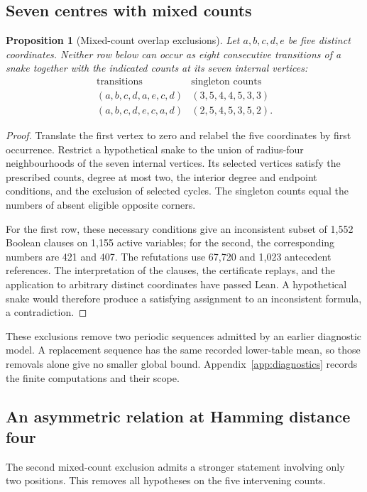 \documentclass[11pt,a4paper]{article}
\newtheorem{proposition}[theorem]{Proposition}
\theoremstyle{definition}
\theoremstyle{remark}
\begin{document}
\subsection{Seven centres with mixed counts}\label{sec:critical-overlap}
\begin{proposition}[Mixed-count overlap exclusions]\label{prop:mixed-overlap}
Let $a,b,c,d,e$ be five distinct coordinates. Neither row below can occur as eight consecutive transitions of a snake together with the indicated counts at its seven internal vertices:
\[
\begin{array}{c|c}
\text{transitions}&\text{singleton counts}\\\hline
(a,b,c,d,a,e,c,d)&(3,5,4,4,5,3,3)\\
(a,b,c,d,e,c,a,d)&(2,5,4,5,3,5,2).
\end{array}
\]
\end{proposition}
\begin{proof}
Translate the first vertex to zero and relabel the five coordinates by first occurrence. Restrict a hypothetical snake to the union of radius-four neighbourhoods of the seven internal vertices. Its selected vertices satisfy the prescribed counts, degree at most two, the interior degree and endpoint conditions, and the exclusion of selected cycles. The singleton counts equal the numbers of absent eligible opposite corners.

For the first row, these necessary conditions give an inconsistent subset of 1,552 Boolean clauses on 1,155 active variables; for the second, the corresponding numbers are 421 and 407. The refutations use 67,720 and 1,023 antecedent references. The interpretation of the clauses, the certificate replays, and the application to arbitrary distinct coordinates have passed Lean. A hypothetical snake would therefore produce a satisfying assignment to an inconsistent formula, a contradiction.
\end{proof}


These exclusions remove two periodic sequences admitted by an earlier diagnostic model. A replacement sequence has the same recorded lower-table mean, so those removals alone give no smaller global bound. Appendix~\ref{app:diagnostics} records the finite computations and their scope.

\subsection{An asymmetric relation at Hamming distance four}\label{sec:distance-four}
The second mixed-count exclusion admits a stronger statement involving only two positions. This removes all hypotheses on the five intervening counts.
\end{document}
